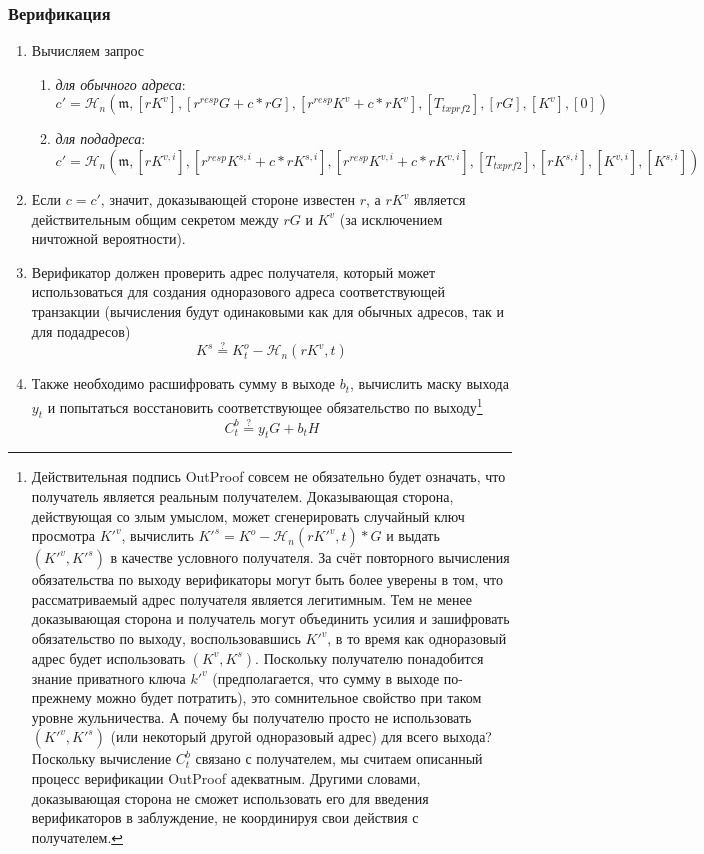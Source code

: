 \subsubsection*{Верификация}

\begin{enumerate}
    \item Вычисляем запрос
    \begin{enumerate}
        \item {\em для обычного адреса}:\vspace{.145cm}
	    \[c' = \mathcal{H}_n(\mathfrak{m},[rK^v], [r^{resp} G + c*r G], [r^{resp} K^v + c*r K^v], [T_{txprf2}], [rG], [K^v], [0])\]
	    \item {\em для подадреса}:\vspace{.16cm}
	    \[c' = \mathcal{H}_n(\mathfrak{m},[rK^{v,i}], [r^{resp} K^{s,i} + c*r K^{s,i}], [r^{resp} K^{v,i} + c*r K^{v,i}], [T_{txprf2}], [rK^{s,i}], [K^{v,i}], [K^{s,i}])\]
    \end{enumerate}{}
    \item Если $c = c'$, значит, доказывающей стороне известен $r$, а $rK^v$ является действительным общим секретом между $r G$ и $K^v$ (за исключением ничтожной вероятности).
    \item Верификатор должен проверить адрес получателя, который может использоваться для создания одноразового адреса соответствующей транзакции (вычисления будут одинако\-выми как для обычных адресов, так и для подадресов)
    \[K^s \stackrel{?}{=} K^o_t - \mathcal{H}_n(r K^v,t)\]
    \item Также необходимо расшифровать сумму в выходе $b_t$, вычислить маску выхода $y_t$ и попытаться восстановить соответствующее обязательство по выходу\footnote{Действительная подпись OutProof совсем не обязательно будет означать, что получатель является реальным получателем. Доказывающая сторона, действующая со злым умыслом, может сгенерировать случайный ключ просмотра $K'^v$, вычислить $K'^s = K^o - \mathcal{H}_n(rK'^v,t)*G$ и выдать $(K'^v,K'^s)$ в качестве условного получателя. За счёт повторного вычисления обязательства по выходу верификаторы могут быть более уверены в том, что рассматриваемый адрес получателя является легитимным. Тем не менее доказывающая сторона и получатель могут объединить усилия и зашифровать обязательство по выходу, воспользовавшись $K'^v$, в то время как одноразовый адрес будет использовать $(K^v,K^s)$. Поскольку получателю понадобится знание приватного ключа $k'^v$ (предполагается, что сумму в выходе по-прежнему можно будет потратить), это сомнительное свойство при таком уровне жульничества. А почему бы получателю просто не использовать $(K'^v,K'^s)$ (или некоторый другой одноразовый адрес) для всего выхода? Поскольку вычисление $C^b_t$ связано с получателем, мы считаем описанный процесс верификации OutProof адекватным. Другими словами, доказывающая сторона не сможет использовать его для введения верификаторов в заблуждение, не координируя свои действия с получателем.}\vspace{.175cm}
    \[C^b_t \stackrel{?}{=} y_t G + b_t H\]
\end{enumerate}{}


